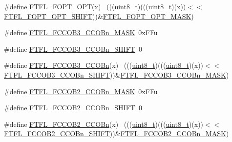 \begin{DoxyCompactItemize}
\item 
\#define \hyperlink{group___f_t_f_l___register___masks_ga4af1975ba289c7910bc8b5182daaf750}{F\+T\+F\+L\+\_\+\+F\+O\+P\+T\+\_\+\+O\+PT}(x)                                              ~(((\hyperlink{_p_e___types_8h_aba7bc1797add20fe3efdf37ced1182c5}{uint8\+\_\+t})(((\hyperlink{_p_e___types_8h_aba7bc1797add20fe3efdf37ced1182c5}{uint8\+\_\+t})(x))$<$$<$\hyperlink{group___f_t_f_l___register___masks_gaf9bb9e944f624d01fbeef30f7b164a0b}{F\+T\+F\+L\+\_\+\+F\+O\+P\+T\+\_\+\+O\+P\+T\+\_\+\+S\+H\+I\+FT}))\&\hyperlink{group___f_t_f_l___register___masks_ga680d0e8b99b5bc4b2f8c88141ea38542}{F\+T\+F\+L\+\_\+\+F\+O\+P\+T\+\_\+\+O\+P\+T\+\_\+\+M\+A\+SK})
\item 
\#define \hyperlink{group___f_t_f_l___register___masks_gacff4adeaedde61f2512f172b251e9b65}{F\+T\+F\+L\+\_\+\+F\+C\+C\+O\+B3\+\_\+\+C\+C\+O\+Bn\+\_\+\+M\+A\+SK}~0x\+F\+Fu
\item 
\#define \hyperlink{group___f_t_f_l___register___masks_ga2e92f6724d8bd90661bf049fec1d6aef}{F\+T\+F\+L\+\_\+\+F\+C\+C\+O\+B3\+\_\+\+C\+C\+O\+Bn\+\_\+\+S\+H\+I\+FT}~0
\item 
\#define \hyperlink{group___f_t_f_l___register___masks_ga2b503163ecce1fbdf00bb31fc4747bf0}{F\+T\+F\+L\+\_\+\+F\+C\+C\+O\+B3\+\_\+\+C\+C\+O\+Bn}(x)                                      ~(((\hyperlink{_p_e___types_8h_aba7bc1797add20fe3efdf37ced1182c5}{uint8\+\_\+t})(((\hyperlink{_p_e___types_8h_aba7bc1797add20fe3efdf37ced1182c5}{uint8\+\_\+t})(x))$<$$<$\hyperlink{group___f_t_f_l___register___masks_ga2e92f6724d8bd90661bf049fec1d6aef}{F\+T\+F\+L\+\_\+\+F\+C\+C\+O\+B3\+\_\+\+C\+C\+O\+Bn\+\_\+\+S\+H\+I\+FT}))\&\hyperlink{group___f_t_f_l___register___masks_gacff4adeaedde61f2512f172b251e9b65}{F\+T\+F\+L\+\_\+\+F\+C\+C\+O\+B3\+\_\+\+C\+C\+O\+Bn\+\_\+\+M\+A\+SK})
\item 
\#define \hyperlink{group___f_t_f_l___register___masks_gaa60c7033bb068990e63e100ccf5c54ce}{F\+T\+F\+L\+\_\+\+F\+C\+C\+O\+B2\+\_\+\+C\+C\+O\+Bn\+\_\+\+M\+A\+SK}~0x\+F\+Fu
\item 
\#define \hyperlink{group___f_t_f_l___register___masks_gaa11731c4e896da19de9df4e265894cb9}{F\+T\+F\+L\+\_\+\+F\+C\+C\+O\+B2\+\_\+\+C\+C\+O\+Bn\+\_\+\+S\+H\+I\+FT}~0
\item 
\#define \hyperlink{group___f_t_f_l___register___masks_gab2aec82d4a41a7d98ed292e147082a3a}{F\+T\+F\+L\+\_\+\+F\+C\+C\+O\+B2\+\_\+\+C\+C\+O\+Bn}(x)                                      ~(((\hyperlink{_p_e___types_8h_aba7bc1797add20fe3efdf37ced1182c5}{uint8\+\_\+t})(((\hyperlink{_p_e___types_8h_aba7bc1797add20fe3efdf37ced1182c5}{uint8\+\_\+t})(x))$<$$<$\hyperlink{group___f_t_f_l___register___masks_gaa11731c4e896da19de9df4e265894cb9}{F\+T\+F\+L\+\_\+\+F\+C\+C\+O\+B2\+\_\+\+C\+C\+O\+Bn\+\_\+\+S\+H\+I\+FT}))\&\hyperlink{group___f_t_f_l___register___masks_gaa60c7033bb068990e63e100ccf5c54ce}{F\+T\+F\+L\+\_\+\+F\+C\+C\+O\+B2\+\_\+\+C\+C\+O\+Bn\+\_\+\+M\+A\+SK})
$$
\end{DoxyCompactItemize}
